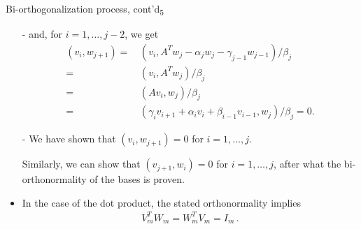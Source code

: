 \documentclass[t,usepdftitle=false]{beamer}
\begin{document}
\begin{frame}{Bi-orthogonalization process, cont'd\textsubscript{5}}
\begin{itemize}
\item[-] and, for $i=1,\dots,j-2$, we get 
\begin{align*}
(v_i,w_{j+1})
=&\,(v_i,A^Tw_j-\alpha_jw_j-\gamma_{j-1}w_{j-1})/\beta_j\\
=&\,(v_i,A^Tw_j)/\beta_j\\
=&\,(Av_i,w_j)/\beta_j\\
=&\,(\gamma_iv_{i+1}+\alpha_iv_i+\beta_{i-1}v_{i-1},w_j)/\beta_j=0.
\end{align*}
\item[-] We have shown that $(v_i,w_{j+1})=0$ for $i=1,\dots,j$. 
\item[] Similarly, we can show that $(v_{j+1},w_i)=0$ for $i=1,\dots,j$, after what the bi-orthonormality of the bases is proven.
\item In the case of the dot product, the stated orthonormality implies 
\begin{align*}
\boxed{
V_m^TW_m=W_m^TV_m=I_m
}\,.
\end{align*}
\end{itemize}
\end{frame}
\end{document}
